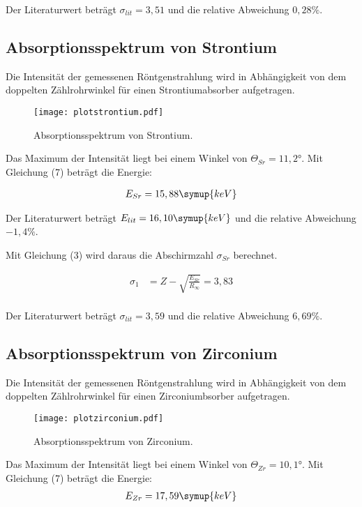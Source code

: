 Der Literaturwert beträgt $\sigma_{lit} = 3,51$ und die relative Abweichung $0,28\%$.

\subsection{Absorptionsspektrum von Strontium}

Die Intensität der gemessenen Röntgenstrahlung wird in Abhängigkeit von dem doppelten Zählrohrwinkel für
einen Strontiumabsorber aufgetragen.

\begin{figure}[H]
  \centering
  \texttt{[image: plotstrontium.pdf]}
  \caption{Absorptionsspektrum von Strontium.}
  \label{fig:plot}
\end{figure}

Das Maximum der Intensität liegt bei einem Winkel von $\Theta_{Sr} = 11,2°$.
Mit Gleichung (7) beträgt die Energie:

\begin{align*}
  E_{Sr} = 15,88 \symup{keV}
\end{align*}

Der Literaturwert beträgt $E_{lit} = 16,10 \symup{keV}$ und die relative Abweichung $-1,4\%$.


Mit Gleichung (3) wird daraus die Abschirmzahl $\sigma_{Sr}$  berechnet.

\begin{align*}
  \sigma_1 &= Z - \sqrt{\frac{E_{Sr}}{R_{\infty}}} = 3,83 \\
\end{align*}

Der Literaturwert beträgt $\sigma_{lit} = 3,59$ und die relative Abweichung $6,69\%$.


\subsection{Absorptionsspektrum von Zirconium}

Die Intensität der gemessenen Röntgenstrahlung wird in Abhängigkeit von dem doppelten Zählrohrwinkel für
einen Zirconiumbsorber aufgetragen.

\begin{figure}[H]
  \centering
  \texttt{[image: plotzirconium.pdf]}
  \caption{Absorptionsspektrum von Zirconium.}
  \label{fig:plot}
\end{figure}


Das Maximum der Intensität liegt bei einem Winkel von $\Theta_{Zr} = 10,1°$.
Mit Gleichung (7) beträgt die Energie:
\begin{align*}
  E_{Zr} = 17,59 \symup{keV}
\end{align*}

